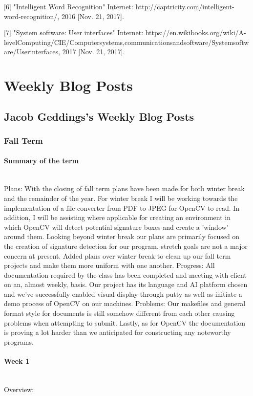 \documentclass[article, onecolumn, draftclsnofoot,10pt, compsoc]{IEEEtran}
\begin{document}
[6] "Intelligent Word Recognition" Internet: http://captricity.com/intelligent-word-recognition/, 2016 [Nov. 21, 2017].

[7] "System software: User interfaces" Internet: https://en.wikibooks.org/wiki/A-levelComputing/CIE/Computersystems,communicationsandsoftware/Systemsoftware/Userinterfaces, 2017 [Nov. 21, 2017].

\section{Weekly Blog Posts}
\subsection{Jacob Geddings's Weekly Blog Posts}
\subsubsection{Fall Term}
\paragraph{Summary of the term}
\mbox{}\\
Plans: With the closing of fall term plans have been made for both winter break and the remainder of the year. For winter break I will be working towards the implementation of a file converter from PDF to JPEG for OpenCV to read. In addition, I will be assisting where applicable for creating an environment in which OpenCV will detect potential signature boxes and create a 'window' around them. Looking beyond winter break our plans are primarily focused on the creation of signature detection for our program, stretch goals are not a major concern at present. Added plans over winter break to clean up our fall term projects and make them more uniform with one another.
Progress: All documentation required by the class has been completed and meeting with client on an, almost weekly, basis. Our project has its language and AI platform chosen and we've successfully enabled visual display through putty as well as initiate a demo process of OpenCV on our machines.
Problems: Our makefiles and general format style for documents is still somehow different from each other causing problems when attempting to submit. Lastly, as for OpenCV the documentation is proving a lot harder than we anticipated for constructing any noteworthy programs. 


\paragraph{Week 1}
\mbox{}\\
Overview:
\end{document}
